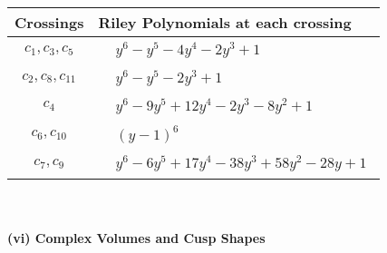 \documentclass[1p]{elsarticle_modified}
\theoremstyle{definition}
\begin{document}
\begin{tabular}{m{50pt}|m{274pt}}
Crossings & \hspace{64pt}Riley Polynomials at each crossing \\
\hline $$\begin{aligned}c_{1},c_{3},c_{5}\end{aligned}$$&$\begin{aligned}
&y^6- y^5-4 y^4-2 y^3+1
\end{aligned}$\\
\hline $$\begin{aligned}c_{2},c_{8},c_{11}\end{aligned}$$&$\begin{aligned}
&y^6- y^5-2 y^3+1
\end{aligned}$\\
\hline $$\begin{aligned}c_{4}\end{aligned}$$&$\begin{aligned}
&y^6-9 y^5+12 y^4-2 y^3-8 y^2+1
\end{aligned}$\\
\hline $$\begin{aligned}c_{6},c_{10}\end{aligned}$$&$\begin{aligned}
&(y-1)^6
\end{aligned}$\\
\hline $$\begin{aligned}c_{7},c_{9}\end{aligned}$$&$\begin{aligned}
&y^6-6 y^5+17 y^4-38 y^3+58 y^2-28 y+1
\end{aligned}$\\
\hline
\end{tabular}\\~\\
\newpage\flushleft \textbf{(vi) Complex Volumes and Cusp Shapes}
\end{document}
